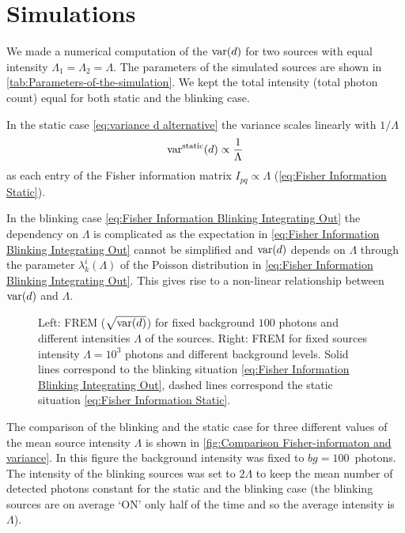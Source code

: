
\section{Simulations} 

We made a numerical computation of the $\mathrm{var}(d)$ for two sources with equal intensity $\Lambda_1=\Lambda_2=\Lambda$. The parameters of the simulated sources are shown in \autoref{tab:Parameters-of-the-simulation}. We kept the total intensity (total photon count) equal for both static and the blinking case.

In the static case \autoref{eq:variance d alternative} the variance scales linearly with $1/\Lambda$ 
%
\begin{equation}
	\mathrm{var}^{\text{static}}(d)\propto\frac{1}{\Lambda}
\end{equation}
%
as each entry of the Fisher information matrix $I_{pq}\propto\Lambda$ (\autoref{eq:Fisher Information Static}).

In the blinking case \autoref{eq:Fisher Information Blinking Integrating Out} the dependency on $\Lambda$ is complicated as the expectation in \autoref{eq:Fisher Information Blinking Integrating Out} cannot be simplified and $\mathrm{var}(d)$ depends on $\Lambda$ through the parameter $\lambda_k^i(\Lambda)$ of the Poisson distribution in \autoref{eq:Fisher Information Blinking Integrating Out}. This gives rise to a non-linear relationship between $\mathrm{var}(d)$ and $\Lambda$.
%
\begin{figure}[!h]
	\centering
	\newcommand{\wf}{.49\textwidth}
	
	\caption{Left: FREM ($\sqrt{\mathrm{var}(d)}$) for fixed background $100$ photons and different intensities $\Lambda$ of the sources. Right: FREM for fixed sources intensity $\Lambda=10^3$ photons and different background levels. Solid lines correspond to the blinking situation \autoref{eq:Fisher Information Blinking Integrating Out}, dashed lines correspond the static situation \autoref{eq:Fisher Information Static}. 
	\label{fig:Comparison Fisher-informaton and variance}}
\end{figure}

The comparison of the blinking and the static case for three different values of the mean source intensity $\Lambda$ is shown in \autoref{fig:Comparison Fisher-informaton and variance}\aaa. In this figure the background intensity was fixed to $bg=100$~photons. The intensity of the blinking sources was set to $2\Lambda$ to keep the mean number of detected photons constant for the static and the blinking case (the blinking sources are on average `ON' only half of the time and so the average intensity is $\Lambda$). 

